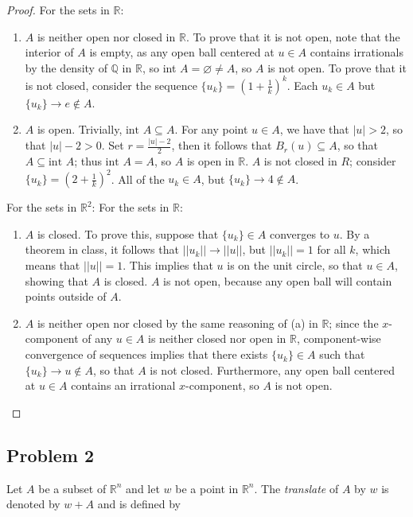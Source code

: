 \documentclass{article}
\begin{document}
\begin{proof}
For the sets in $\mathbb{R}$:
\begin{enumerate}[label=(\alph*)]
\item $A$ is neither open nor closed in $\mathbb{R}$. To prove that it is not open, note that the interior of $A$ is empty, as any open ball centered at $u \in A$ contains irrationals by the density of $\mathbb{Q}$ in $\mathbb{R}$, so int $A = \varnothing \neq A$, so $A$ is not open. To prove that it is not closed, consider the sequence $\{u_k\} = (1+\frac{1}{k})^k$. Each $u_k \in A$ but $\{u_k\} \to e \notin A$.
\item $A$ is open. Trivially, $\text{int } A \subseteq A$. For any point $u \in A$, we have that $|u| > 2$, so that $|u| - 2 > 0$. Set $r = \frac{|u|-2}{2}$, then it follows that $B_r(u) \subseteq A$, so that $A \subseteq \text{int } A$; thus $\text{int } A = A$, so $A$ is open in $\mathbb{R}$. $A$ is not closed in $R$; consider $\{u_k\} = (2+\frac{1}{k})^2$. All of the $u_k \in A$, but $\{u_k\} \to 4 \notin A$.
\end{enumerate}
For the sets in $\mathbb{R}^2$:
For the sets in $\mathbb{R}$:
\begin{enumerate}[label=(\alph*)]
\item $A$ is closed. To prove this, suppose that $\{u_k\} \in A$ converges to $u$. By a theorem in class, it follows that $||u_k|| \to ||u||$, but $||u_k|| = 1$ for all $k$, which means that $||u|| = 1$. This implies that $u$ is on the unit circle, so that $u \in A$, showing that $A$ is closed. $A$ is not open, because any open ball will contain points outside of $A$.  
\item $A$ is neither open nor closed by the same reasoning of (a) in $\mathbb{R}$; since the $x$- component of any $u \in A$ is neither closed nor open in $\mathbb{R}$, component-wise convergence of sequences implies that there exists $\{u_k\} \in A$ such that $\{u_k\} \to u \notin A$, so that $A$ is not closed. Furthermore, any open ball centered at $u \in A$ contains an irrational $x$-component, so $A$ is not open.  
\end{enumerate}
\end{proof}


\subsection*{Problem 2}

Let $A$ be a subset of $\mathbb{R}^n$ and let $w$ be a point in $\mathbb{R}^n$. The \textit{translate} of $A$ by $w$ is denoted by $w + A$ and is defined by 
\end{document}
